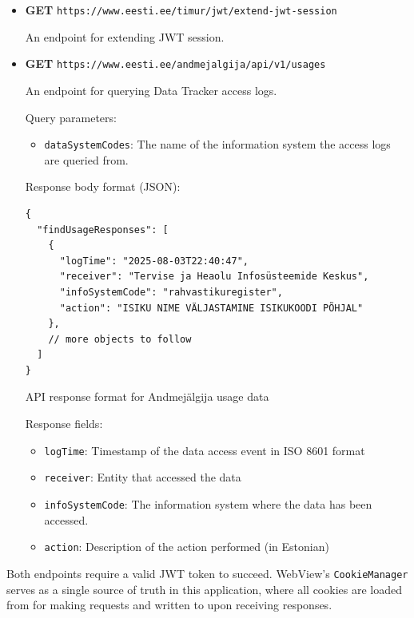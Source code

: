 \begin{itemize}
    \item \textbf{GET} \texttt{https://www.eesti.ee/timur/jwt/extend-jwt-session}
    
    An endpoint for extending JWT session.
    
    \item \textbf{GET} \texttt{https://www.eesti.ee/andmejalgija/api/v1/usages}
    
    An endpoint for querying Data Tracker access logs.
    
    Query parameters:
    \begin{itemize}
        \item \texttt{dataSystemCodes}: The name of the information system the access logs are queried from.
    \end{itemize}
    
    \samepage
    Response body format (JSON):
    \begin{listing}[H]
    \begin{verbatim}
{
  "findUsageResponses": [
    {
      "logTime": "2025-08-03T22:40:47",
      "receiver": "Tervise ja Heaolu Infosüsteemide Keskus",
      "infoSystemCode": "rahvastikuregister",
      "action": "ISIKU NIME VÄLJASTAMINE ISIKUKOODI PÕHJAL"
    },
    // more objects to follow
  ]
}
    \end{verbatim}
    \caption{API response format for Andmejälgija usage data}
    \label{lst:andmejalgija-response}
    \end{listing}
    
    Response fields:
    \begin{itemize}
        \item \texttt{logTime}: Timestamp of the data access event in ISO 8601 format
        \item \texttt{receiver}: Entity that accessed the data
        \item \texttt{infoSystemCode}: The information system where the data has been accessed.
        \item \texttt{action}: Description of the action performed (in Estonian)
    \end{itemize}
\end{itemize}

Both endpoints require a valid JWT token to succeed. WebView's \texttt{CookieManager} serves as a single source of truth in this application, where all cookies are loaded from for making requests and written to upon receiving responses.

